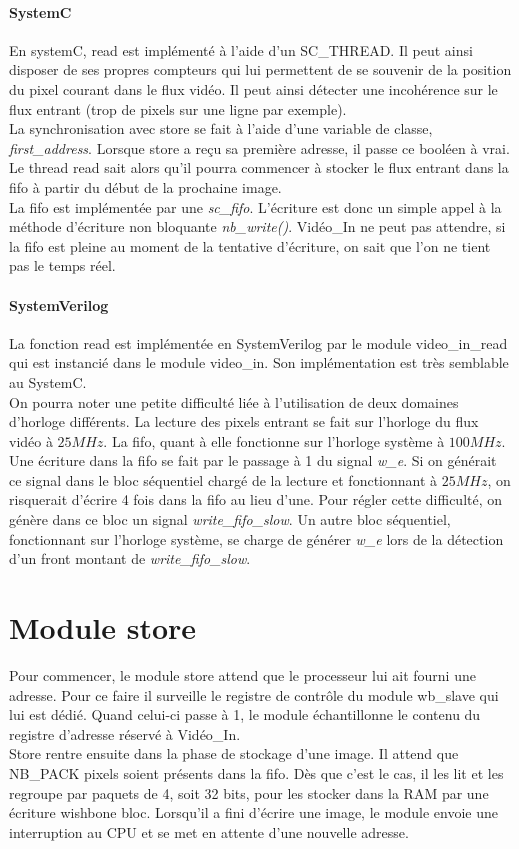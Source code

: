 \documentclass[a4paper,12pt]{report}
\begin{document}
{{		\paragraph{SystemC}
	 En systemC, read est implémenté à l'aide d'un SC\_THREAD.
		Il peut ainsi disposer de ses propres compteurs qui lui permettent de se souvenir de la position
		du pixel courant dans le flux vidéo.
		Il peut ainsi détecter une incohérence sur le flux entrant (trop de pixels sur une ligne par exemple).\\
		La synchronisation avec store se fait à l'aide d'une variable de classe, \emph{first\_address}.
		Lorsque store a reçu sa première adresse, il passe ce booléen à vrai.
		Le thread read sait alors qu'il pourra commencer à stocker le flux entrant dans la fifo à partir du début de la prochaine image.\\
		La fifo est implémentée par une \emph{sc\_fifo}.
		L'écriture est donc un simple appel à la méthode d'écriture non bloquante \emph{nb\_write()}.
		Vidéo\_In ne peut pas attendre,
		si la fifo est pleine au moment de la tentative d'écriture, on sait que l'on ne tient pas le temps réel.

		  \paragraph{SystemVerilog}
	 La fonction read est implémentée en SystemVerilog par le module video\_in\_read qui est instancié dans le module video\_in.
		Son implémentation est très semblable au SystemC.\\
		On pourra noter une petite difficulté liée à l'utilisation de deux domaines d'horloge différents.
		La lecture des pixels entrant se fait sur l'horloge du flux vidéo à $25MHz$.
		La fifo, quant à elle fonctionne sur l'horloge système à $100MHz$.
		Une écriture dans la fifo se fait par le passage à 1 du signal \emph{w\_e}.
		Si on générait ce signal dans le bloc séquentiel chargé de la lecture et fonctionnant à $25MHz$,
			on risquerait d'écrire 4 fois dans la fifo au lieu d'une.
			  Pour régler cette difficulté, on génère dans ce bloc un signal \emph{write\_fifo\_slow}.
			  Un autre bloc séquentiel, fonctionnant sur l'horloge système, se charge de générer \emph{w\_e} lors de la
			  détection d'un front montant de \emph{write\_fifo\_slow}.


			  \section*{Module store}
	 Pour commencer, le module store attend que le processeur lui ait fourni une adresse. Pour ce faire il surveille le registre de contrôle du module wb\_slave
		qui lui est dédié. Quand celui-ci passe à 1, le module échantillonne le contenu du registre d'adresse réservé à Vidéo\_In. \\
		Store rentre ensuite dans la phase de stockage d'une image.
		Il attend que NB\_PACK pixels soient présents dans la fifo. Dès que c'est le cas, il les lit et les regroupe par paquets de 4, soit 32 bits,
			pour les stocker dans la RAM par une écriture wishbone bloc.
			  Lorsqu'il a fini d'écrire une image, le module envoie une interruption au CPU et se met en attente d'une nouvelle adresse.

}}
\end{document}
